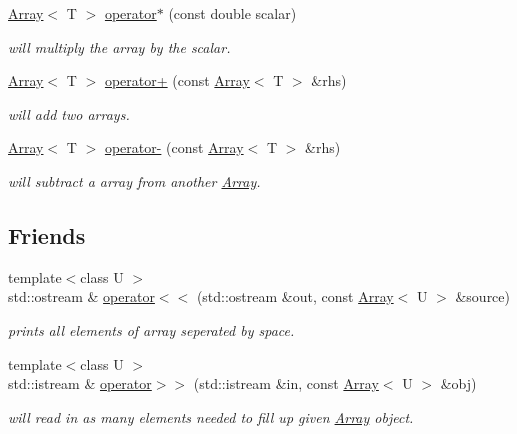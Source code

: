 \begin{DoxyCompactItemize}
\hyperlink{classArray}{Array}$<$ T $>$ \hyperlink{classArray_ae4a8aa69ef5f08592c1fc90dba4cb4db}{operator$\ast$} (const double scalar)
\begin{DoxyCompactList}\small\item\em will multiply the array by the scalar. \end{DoxyCompactList}\item 
\hyperlink{classArray}{Array}$<$ T $>$ \hyperlink{classArray_a084d137b172c4e0e1e71b3ca75984945}{operator+} (const \hyperlink{classArray}{Array}$<$ T $>$ \&rhs)
\begin{DoxyCompactList}\small\item\em will add two arrays. \end{DoxyCompactList}\item 
\hyperlink{classArray}{Array}$<$ T $>$ \hyperlink{classArray_a78268aed7c7c15605d42847ce378aa60}{operator-\/} (const \hyperlink{classArray}{Array}$<$ T $>$ \&rhs)
\begin{DoxyCompactList}\small\item\em will subtract a array from another \hyperlink{classArray}{Array}. \end{DoxyCompactList}\end{DoxyCompactItemize}
\subsection*{Friends}
\begin{DoxyCompactItemize}
\item 
{\footnotesize template$<$class U $>$ }\\std\+::ostream \& \hyperlink{classArray_abcf15181b9dccdf2d434f6d05c04896c}{operator$<$$<$} (std\+::ostream \&out, const \hyperlink{classArray}{Array}$<$ U $>$ \&source)
\begin{DoxyCompactList}\small\item\em prints all elements of array seperated by space. \end{DoxyCompactList}\item 
{\footnotesize template$<$class U $>$ }\\std\+::istream \& \hyperlink{classArray_a68f2152ebc0554837f93354b9e064288}{operator$>$$>$} (std\+::istream \&in, const \hyperlink{classArray}{Array}$<$ U $>$ \&obj)
\begin{DoxyCompactList}\small\item\em will read in as many elements needed to fill up given \hyperlink{classArray}{Array} object. \end{DoxyCompactList}\end{DoxyCompactItemize}


